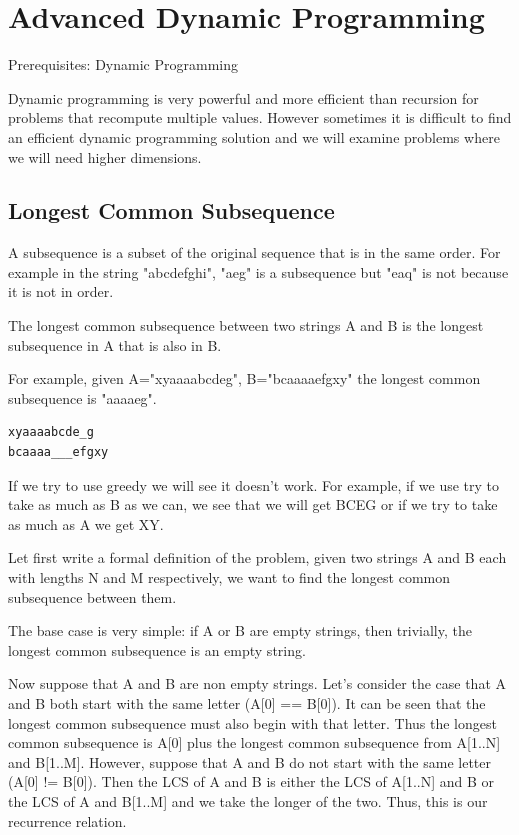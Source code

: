 \documentclass[11pt,oneside]{book}
\begin{document}
        \section{ Advanced Dynamic Programming }
        

Prerequisites: Dynamic Programming

Dynamic programming is very powerful and more efficient than recursion for problems that recompute multiple values. However sometimes it is difficult to find an efficient dynamic programming solution and we will examine problems where we will need higher dimensions.

\subsection{Longest Common Subsequence}



A subsequence is a subset of the original sequence that is in the same order. For example in the string "abcdefghi", "aeg" is a subsequence but "eaq" is not because it is not in order.

The longest common subsequence between two strings A and B is the longest subsequence in A that is also in B.

For example, given A="xyaaaabcdeg", B="bcaaaaefgxy" the longest common subsequence is "aaaaeg".

\begin{lstlisting}
xyaaaabcde_g
bcaaaa___efgxy
\end{lstlisting}

If we try to use greedy we will see it doesn't work. For example, if we use try to take as much as B as we can, we see that we will get BCEG or if we try to take as much as A we get XY.




Let first write a formal definition of the problem, given two strings A and B each with lengths N and M respectively, we want to find the longest common subsequence between them.

The base case is very simple: if A or B are empty strings, then trivially, the longest common subsequence is an empty string.

Now suppose that A and B are non empty strings. Let's consider the case that A and B both start with the same letter (A[0] == B[0]). It can be seen that the longest common subsequence must also begin with that letter. Thus the longest common subsequence is A[0] plus the longest common subsequence from A[1..N] and B[1..M]. However, suppose that A and B do not start with the same letter (A[0] != B[0]). Then the LCS of A and B is either the LCS of A[1..N] and B or the LCS of A and B[1..M] and we take the longer of the two. Thus, this is our recurrence relation.
\end{document}
